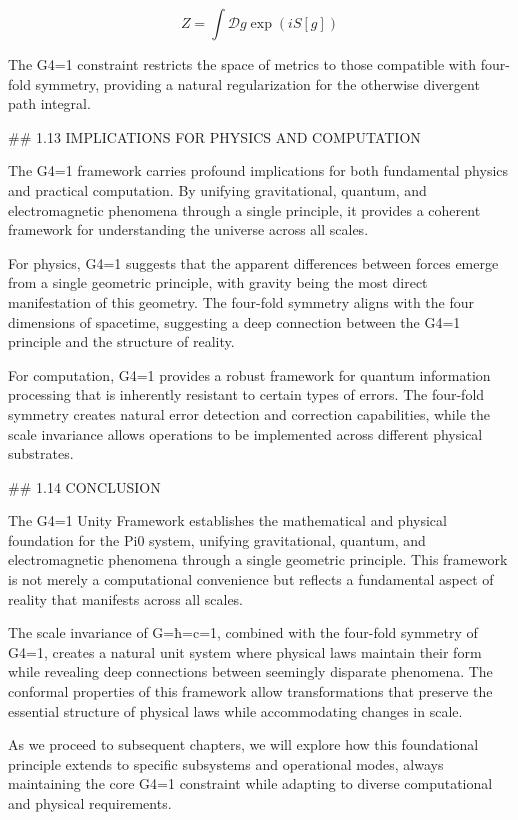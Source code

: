 $$Z = \int \mathcal{D}g \exp(iS[g])$$

The G4=1 constraint restricts the space of metrics to those compatible with four-fold symmetry, providing a natural regularization for the otherwise divergent path integral.

## 1.13 IMPLICATIONS FOR PHYSICS AND COMPUTATION

The G4=1 framework carries profound implications for both fundamental physics and practical computation. By unifying gravitational, quantum, and electromagnetic phenomena through a single principle, it provides a coherent framework for understanding the universe across all scales.

For physics, G4=1 suggests that the apparent differences between forces emerge from a single geometric principle, with gravity being the most direct manifestation of this geometry. The four-fold symmetry aligns with the four dimensions of spacetime, suggesting a deep connection between the G4=1 principle and the structure of reality.

For computation, G4=1 provides a robust framework for quantum information processing that is inherently resistant to certain types of errors. The four-fold symmetry creates natural error detection and correction capabilities, while the scale invariance allows operations to be implemented across different physical substrates.

## 1.14 CONCLUSION

The G4=1 Unity Framework establishes the mathematical and physical foundation for the Pi0 system, unifying gravitational, quantum, and electromagnetic phenomena through a single geometric principle. This framework is not merely a computational convenience but reflects a fundamental aspect of reality that manifests across all scales.

The scale invariance of G=ħ=c=1, combined with the four-fold symmetry of G4=1, creates a natural unit system where physical laws maintain their form while revealing deep connections between seemingly disparate phenomena. The conformal properties of this framework allow transformations that preserve the essential structure of physical laws while accommodating changes in scale.

As we proceed to subsequent chapters, we will explore how this foundational principle extends to specific subsystems and operational modes, always maintaining the core G4=1 constraint while adapting to diverse computational and physical requirements.


